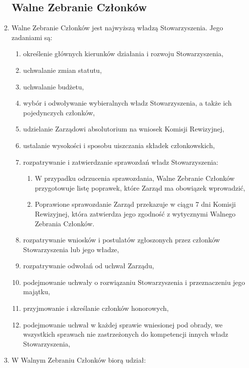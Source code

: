 \documentclass{article}
\begin{document}
\begin{enumerate}
    \subsection{Walne Zebranie Członków}
	    \item Walne Zebranie Członków jest najwyższą władzą Stowarzyszenia. Jego zadaniami są:
	      \begin{enumerate}
	        \item określenie głównych kierunków działania i rozwoju Stowarzyszenia,
	        \item uchwalanie zmian statutu,
	        \item uchwalanie budżetu,
	        \item wybór i odwoływanie wybieralnych władz Stowarzyszenia, a także ich pojedynczych członków,
	        \item udzielanie Zarządowi absolutorium na wniosek Komisji Rewizyjnej,
	        \item ustalanie wysokości i sposobu uiszczania składek członkowskich,
	        \item rozpatrywanie i zatwierdzanie sprawozdań władz Stowarzyszenia:
	          \begin{enumerate}
	            \item W przypadku odrzucenia sprawozdania, Walne Zebranie Członków przygotowuje listę poprawek, które Zarząd ma obowiązek wprowadzić,
	            \item Poprawione sprawozdanie Zarząd przekazuje w ciągu 7 dni Komisji Rewizyjnej, która zatwierdza jego zgodność z wytycznymi Walnego Zebrania Członków.
	          \end{enumerate}
	        \item rozpatrywanie wniosków i postulatów zgłoszonych przez członków Stowarzyszenia lub jego władze,
	        \item rozpatrywanie odwołań od uchwał Zarządu,
	        \item podejmowanie uchwały o rozwiązaniu Stowarzyszenia i przeznaczeniu jego majątku,
	        \item przyjmowanie i skreślanie członków honorowych,
	        \item podejmowanie uchwał w każdej sprawie wniesionej pod obrady, we wszystkich sprawach nie zastrzeżonych do kompetencji innych władz Stowarzyszenia,
	      \end{enumerate}
	        \item W Walnym Zebraniu Członków biorą udział:
	          \begin{enumerate}

\end{enumerate}
\end{enumerate}
\end{document}

